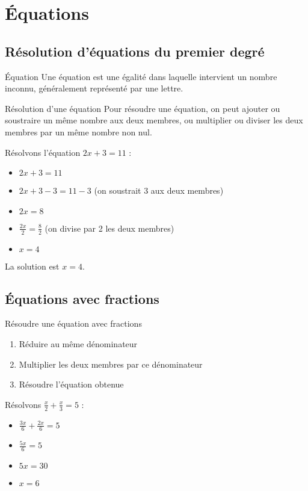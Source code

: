 \chapter{Équations}

\section{Résolution d'équations du premier degré}
\begin{definition}{Équation}
Une équation est une égalité dans laquelle intervient un nombre inconnu, généralement représenté par une lettre.
\end{definition}

\begin{methode}{Résolution d'une équation}
Pour résoudre une équation, on peut ajouter ou soustraire un même nombre aux deux membres, ou multiplier ou diviser les deux membres par un même nombre non nul.
\end{methode}

\begin{exemple}
Résolvons l'équation $2x + 3 = 11$ :
\begin{itemize}
    \item $2x + 3 = 11$
    \item $2x + 3 - 3 = 11 - 3$ (on soustrait 3 aux deux membres)
    \item $2x = 8$
    \item $\frac{2x}{2} = \frac{8}{2}$ (on divise par 2 les deux membres)
    \item $x = 4$
\end{itemize}
La solution est $x = 4$.
\end{exemple}

\section{Équations avec fractions}
\begin{methode}{Résoudre une équation avec fractions}
\begin{enumerate}
    \item Réduire au même dénominateur
    \item Multiplier les deux membres par ce dénominateur
    \item Résoudre l'équation obtenue
\end{enumerate}
\end{methode}

\begin{exemple}
Résolvons $\frac{x}{2} + \frac{x}{3} = 5$ :
\begin{itemize}
    \item $\frac{3x}{6} + \frac{2x}{6} = 5$
    \item $\frac{5x}{6} = 5$
    \item $5x = 30$
    \item $x = 6$
\end{itemize}
\end{exemple}

